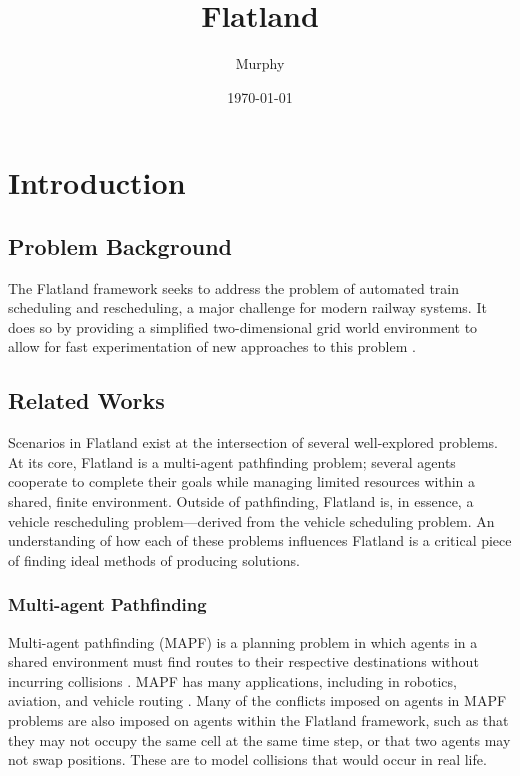 \documentclass[11pt]{article}
\title{Flatland}
\author{Murphy}
\date{\today}
\begin{document}
\maketitle	
\pagebreak

\tableofcontents
\pagebreak


\section{Introduction}
\subsection{Problem Background}
The Flatland framework seeks to address the problem of automated train scheduling and rescheduling, a major challenge
for modern railway systems. It does so by providing a simplified two-dimensional grid world environment to allow for fast experimentation of new approaches to this problem \cite{monylascscbhwaegeibavistsasp20a}. 

\subsection{Related Works}
Scenarios in Flatland exist at the intersection of several well-explored problems.  At its core, Flatland is a multi-agent pathfinding problem; several agents cooperate to complete their goals while managing limited resources within a shared, finite environment.  Outside of pathfinding, Flatland is, in essence, a vehicle rescheduling problem—derived from the vehicle scheduling problem.  An understanding of how each of these problems influences Flatland is a critical piece of finding ideal methods of producing solutions.

\subsubsection{Multi-agent Pathfinding}
Multi-agent pathfinding (MAPF) is a planning problem in which agents in a shared environment must find routes to their respective destinations without incurring collisions \citep{silver05a}.  MAPF has many applications, including in robotics, aviation, and vehicle routing \citep{standley10a}.  Many of the conflicts imposed on agents in MAPF problems are also imposed on agents within the Flatland framework, such as that they may not occupy the same cell at the same time step, or that two agents may not swap positions.  These are to model collisions that would occur in real life.  
\end{document}
